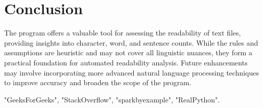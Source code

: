 \documentclass{article}
\begin{document}
\section{Conclusion}
The program offers a valuable tool for assessing the readability of text files, providing insights into character, word, and sentence counts. While the rules and assumptions are heuristic and may not cover all linguistic nuances, they form a practical foundation for automated readability analysis. Future enhancements may involve incorporating more advanced natural language processing techniques to improve accuracy and broaden the scope of the program.



"GeeksForGeeks",
"StackOverflow",
"sparkbyexample",
"RealPython".
\end{document}
